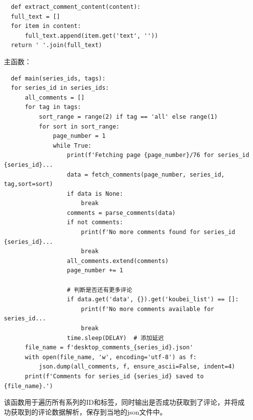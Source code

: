 \documentclass[UTF8,a4paper,15pt,titlepage,oneside]{ctexbook}
\begin{document}
  \begin{mdframed}[backgroundcolor=darkgray, linecolor=lightgray, linewidth=1pt, innermargin=0.5cm, outermargin=0.5cm, skipbelow=0.1cm]
    \color{white}
    \begin{verbatim}
  def extract_comment_content(content):
  full_text = []
  for item in content:
      full_text.append(item.get('text', ''))
  return ' '.join(full_text)  
  \end{verbatim}
  \vspace{-1.5em} %
  \end{mdframed}

主函数：

\begin{mdframed}[backgroundcolor=darkgray, linecolor=lightgray, linewidth=1pt, innermargin=0.5cm, outermargin=0.5cm, skipbelow=0.1cm]
  \color{white}
  \begin{verbatim}
  def main(series_ids, tags):
  for series_id in series_ids:
      all_comments = []
      for tag in tags:
          sort_range = range(2) if tag == 'all' else range(1)
          for sort in sort_range:
              page_number = 1
              while True:
                  print(f'Fetching page {page_number}/76 for series_id {series_id}...
                  data = fetch_comments(page_number, series_id, tag,sort=sort)
                  if data is None:
                      break
                  comments = parse_comments(data)
                  if not comments:
                      print(f'No more comments found for series_id {series_id}...
                      break
                  all_comments.extend(comments)
                  page_number += 1

                  # 判断是否还有更多评论
                  if data.get('data', {}).get('koubei_list') == []:
                      print(f'No more comments available for series_id...
                      break
                  time.sleep(DELAY)  # 添加延迟
      file_name = f'desktop_comments_{series_id}.json'
      with open(file_name, 'w', encoding='utf-8') as f:
          json.dump(all_comments, f, ensure_ascii=False, indent=4)
      print(f'Comments for series_id {series_id} saved to {file_name}.')
\end{verbatim}
\vspace{-1.5em} %
\end{mdframed}

该函数用于遍历所有系列的ID和标签，同时输出是否成功获取到了评论，并将成功获取到的评论数据解析，保存到当地的json文件中。
\end{document}
